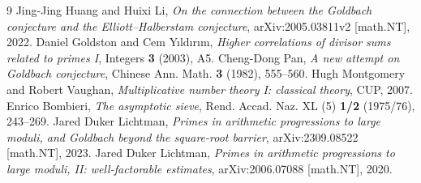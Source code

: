 \documentclass[11pt,a4paper]{article}
\theoremstyle{plain}
\theoremstyle{definition}
\begin{document}
\begin{thebibliography}{9}
 Jing-Jing Huang and Huixi Li,
\emph{On the connection between the Goldbach conjecture and the
Elliott--Halberstam conjecture}, arXiv:2005.03811v2 [math.NT], 2022.
 Daniel Goldston and Cem Y{\i}ld{\i}r{\i}m,
\emph{Higher correlations of divisor sums related to primes I}, Integers
\textbf{3} (2003), A5.
 Cheng-Dong Pan, \emph{A new attempt on Goldbach
conjecture}, Chinese Ann. Math. \textbf{3} (1982), 555--560.
 Hugh Montgomery and Robert Vaughan,
\emph{Multiplicative number theory I: classical theory}, CUP, 2007.
 Enrico Bombieri, \emph{The asymptotic sieve},
Rend. Accad. Naz. XL (5) \textbf{1/2} (1975/76), 243--269.
 Jared Duker Lichtman, \emph{Primes in arithmetic
progressions to large moduli, and Goldbach beyond the square-root
barrier}, arXiv:2309.08522 [math.NT], 2023.
 Jared Duker Lichtman, \emph{Primes in arithmetic
progressions to large moduli, II: well-factorable estimates},
arXiv:2006.07088 [math.NT], 2020.
\end{thebibliography}
\end{document}
